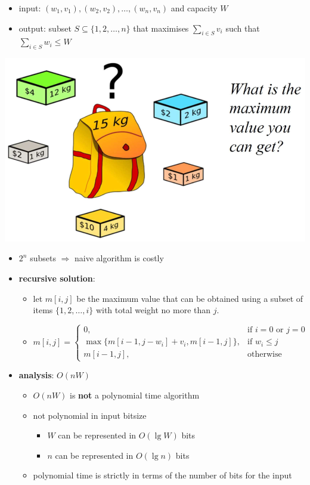 \documentclass[10pt, landscape]{article}
\begin{document}
\begin{multicols*}{4}
  \begin{itemize}
    \item input: $(w_1, v_1), (w_2, v_2), \dots, (w_n, v_n) $ and capacity $W$
    \item output: subset $S \subseteq \{ 1, 2, \dots, n \}$ that maximises $\sum_{i \in S}v_i$ such that $\sum_{i \in S} w_i \leq W$
  \end{itemize}

  \begin{tightcenter}
    \includegraphics[width=0.5\linewidth]{cs3230-knapsack-problem.png} 
  \end{tightcenter}

  \begin{itemize}
    \item $2^n$ subsets $\Rightarrow$ naive algorithm is costly 
    \item \textbf{recursive solution}:
      \begin{itemize}
        \item let $m[i, j]$ be the maximum value that can be obtained using a subset of items $\{1, 2, \dots, i\}$ 
          with total weight no more than $j$.
        \item $m[i, j] = \begin{cases} 0, & \text{if $i=0$ or $j=0$} \\ \max\{ {\scriptstyle m[i-1, j-w_i] + v_i, m[i-1, j] }\}, & \text{if $w_i \leq j$} \\ m[i-1, j], & \text{otherwise} \end{cases} $
      \end{itemize}
    \item \textbf{analysis}: $O(nW)$
      \begin{itemize}
        \item \attention $O(nW)$ is \textbf{not} a polynomial time algorithm
        \item not polynomial in input bitsize 
          \begin{itemize}
            \item $W$ can be represented in $O(\lg W)$ bits
            \item $n$ can be represented in $O(\lg n)$ bits
          \end{itemize}
        \item polynomial time is strictly in terms of the number of bits for the input
      \end{itemize}
  \end{itemize}


\end{multicols*}
\end{document}
